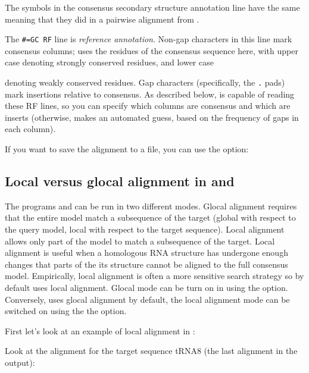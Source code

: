 The symbols in the consensus secondary structure annotation line have
the same meaning that they did in a pairwise alignment from
.

The {\small\verb+#=GC RF+} line is \emph{reference
annotation}. Non-gap characters in this line mark consensus columns;
 uses the residues of the consensus sequence here, with
upper case denoting strongly conserved residues, and lower case

denoting weakly conserved residues. Gap characters (specifically, the
\verb+.+ pads) mark insertions relative to consensus. As described
below,  is capable of reading these RF lines, so you can
specify which columns are consensus and which are inserts (otherwise,
 makes an automated guess, based on the frequency of
gaps in each column).

If you want to save the alignment to a file, you can use the 
option:


\subsection{Local versus glocal alignment in  and }

The programs  and  can be run in two
different modes. Glocal alignment requires that the entire model match
a subsequence of the target (global with respect to the query model,
local with respect to the target sequence). Local alignment allows
only part of the model to match a subsequence of the target. Local
alignment is useful when a homologous RNA structure has undergone
enough changes that parts of the its structure cannot be aligned to
the full consensus model. Empirically, local alignment is often a more
sensitive search strategy so by default 
 uses local alignment. Glocal mode can be turn on in
 using the  option. Conversely,  uses
glocal alignment by default, the local alignment mode can be switched
on using the the  option. 

First let's look at an example of local alignment in :


Look at the alignment for the target sequence tRNA8 (the last alignment in the output): 

